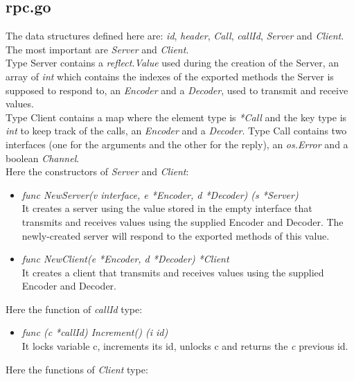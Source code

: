 \subsection{rpc.go}

The data structures defined here are: \emph{id}, \emph{header}, \emph{Call}, \emph{callId}, \emph{Server} and \emph{Client}. The most important are \emph{Server} and \emph{Client}.\\
Type Server contains a \emph{reflect.Value} used during the creation of the Server, an array of \emph{int} which contains the indexes of the exported methods the Server is supposed to respond to, an \emph{Encoder} and a \emph{Decoder}, used to transmit and receive values.\\
Type Client contains a map where the element type is \emph{*Call} and the key type is \emph{int} to keep track of the calls, an \emph{Encoder} and a \emph{Decoder}.
Type Call contains two interfaces (one for the arguments and the other for the reply), an \emph{os.Error} and a boolean \emph{Channel}.\\
Here the constructors of \emph{Server} and \emph{Client}:

\begin{itemize}
 
\item \emph{func NewServer(v interface{}, e *Encoder, d *Decoder) (s *Server)}\\
It creates a server using the value stored in the empty interface that transmits and receives values using the supplied Encoder and Decoder. The newly-created server will respond to the exported methods of this value.

\item \emph{func NewClient(e *Encoder, d *Decoder) *Client}\\
It creates a client that transmits and receives values using the supplied Encoder and Decoder.

\end{itemize}
Here the function of \emph{callId} type:

\begin{itemize}

\item \emph{func (c *callId) Increment() (i id)}\\
It locks variable c, increments its id, unlocks c and returns the \emph{c} previous id.  

\end{itemize}
Here the functions of \emph{Client} type:

